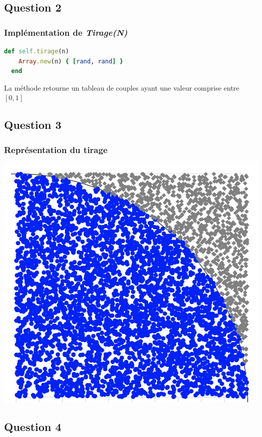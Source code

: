 \documentclass[a4paper,10pt]{report}
\begin{document}
\subsection{Question 2}
\subsubsection{Implémentation de \textit{Tirage(N)}}
\begin{lstlisting}[language=Ruby]
  def self.tirage(n)
    Array.new(n) { [rand, rand] }
  end
\end{lstlisting}
La méthode retourne un tableau de couples ayant une valeur comprise entre $[0,1]$
\bigskip

\subsection{Question 3}
\subsubsection{Représentation du tirage}
\includegraphics[scale=0.75]{images/question_2.png}
\bigskip

\clearpage
\subsection{Question 4}
\end{document}
